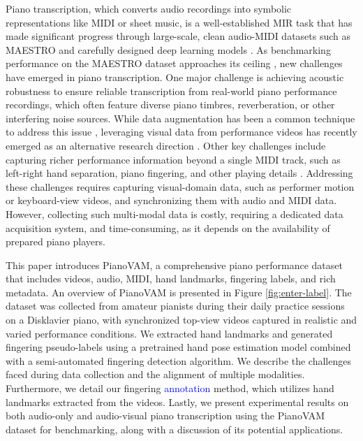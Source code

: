 \documentclass{article}
\newcommand{\alex}[1]{\textcolor{blue}{#1}}%
\begin{document}
Piano transcription, which converts audio recordings into symbolic representations like MIDI or sheet music, is a well-established MIR task that has made significant progress through large-scale, clean audio-MIDI datasets such as MAESTRO \cite{ISMIR18Hawthorne} and carefully designed deep learning models \cite{TASLP21Kong, ISMIR22Wei}. As benchmarking performance on the MAESTRO dataset approaches its ceiling \cite{ISMIR24Yan}, new challenges have emerged in piano transcription. One major challenge is achieving acoustic robustness to ensure reliable transcription from real-world piano performance recordings, which often feature diverse piano timbres, reverberation, or other interfering noise sources. While data augmentation has been a common technique to address this issue \cite{ICLR19Hawthorne, Edwards2024}, leveraging visual data from performance videos has recently emerged as an alternative research direction \cite{CJE15Wan, DAFx21Wang, ICASSPW23Li, TASLP24Li}. Other key challenges include capturing richer performance information beyond a single MIDI track, such as left-right hand separation, piano fingering, and other playing details \cite{InfoSci20Nakamura, MM22Ramoneda}. Addressing these challenges requires capturing visual-domain data, such as performer motion or keyboard-view videos, and synchronizing them with audio and MIDI data. However, collecting such multi-modal data is costly, requiring a dedicated data acquisition system, and time-consuming, as it depends on the availability of prepared piano players. 

This paper introduces PianoVAM, a comprehensive piano performance dataset that includes videos, audio, MIDI, hand landmarks, fingering labels, and rich metadata. An overview of PianoVAM is presented in Figure \ref{fig:enter-label}. The dataset was collected from amateur pianists during their daily practice sessions on a Disklavier piano, with synchronized top-view videos captured in realistic and varied performance conditions. We extracted hand landmarks and generated fingering pseudo-labels using a pretrained hand pose estimation model combined with a semi-automated fingering detection algorithm.  We describe the challenges faced during data collection and the alignment of multiple modalities. Furthermore, we detail our fingering \alex{annotation} method, which utilizes hand landmarks extracted from the videos. Lastly, we present experimental results on both audio-only and audio-visual piano transcription using the PianoVAM dataset for benchmarking, along with a discussion of its potential applications.
\end{document}
